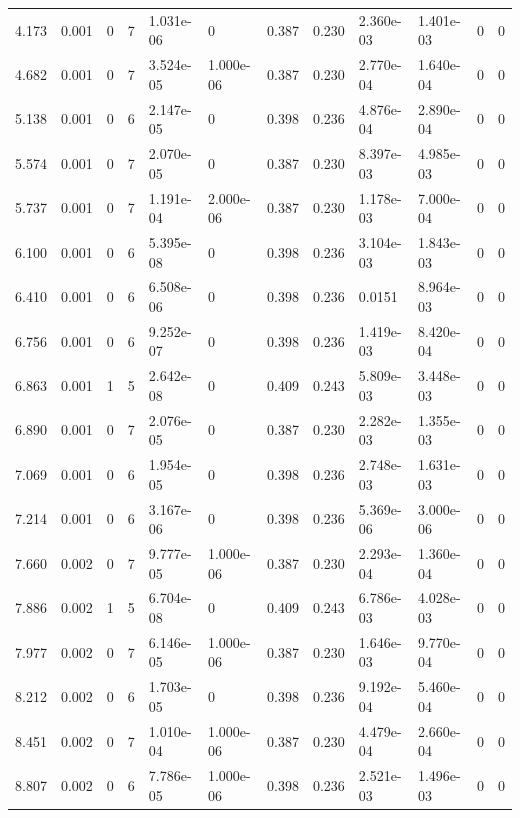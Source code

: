 \documentclass[preview]{standalone}
\begin{document}
{{\begin{tabular}{L{1.2cm}C{1.2cm} C{0.3cm}C{0.5cm} C{1.4cm}C{1.4cm} C{1.4cm}C{1.4cm} C{1.6cm}C{1.6cm} C{1.6cm}C{1.6cm}}
  4.173  &  0.001  & 0     &  7 &  1.031e-06  & 0  &  0.387&   0.230& 2.360e-03 & 1.401e-03   &  0 & 0  \\ 
  4.682  &  0.001  & 0     &  7 &  3.524e-05  & 1.000e-06  &  0.387&   0.230& 2.770e-04 & 1.640e-04   &  0 & 0  \\ 
  5.138  &  0.001  & 0     &  6 &  2.147e-05  & 0  &  0.398&   0.236& 4.876e-04 & 2.890e-04   &  0 & 0  \\ 
  5.574  &  0.001  & 0     &  7 &  2.070e-05  & 0  &  0.387&   0.230& 8.397e-03 & 4.985e-03   &  0 & 0  \\ 
  5.737  &  0.001  & 0     &  7 &  1.191e-04  & 2.000e-06  &  0.387&   0.230& 1.178e-03 & 7.000e-04   &  0 & 0  \\ 
  6.100  &  0.001  & 0     &  6 &  5.395e-08  & 0  &  0.398&   0.236& 3.104e-03 & 1.843e-03   &  0 & 0  \\ 
  6.410  &  0.001  & 0     &  6 &  6.508e-06  & 0  &  0.398&   0.236& 0.0151 & 8.964e-03   &  0 & 0  \\ 
  6.756  &  0.001  & 0     &  6 &  9.252e-07  & 0  &  0.398&   0.236& 1.419e-03 & 8.420e-04   &  0 & 0  \\ 
  6.863  &  0.001  & 1     &  5 &  2.642e-08  & 0  &  0.409&   0.243& 5.809e-03 & 3.448e-03   &  0 & 0  \\ 
  6.890  &  0.001  & 0     &  7 &  2.076e-05  & 0  &  0.387&   0.230& 2.282e-03 & 1.355e-03   &  0 & 0  \\ 
  7.069  &  0.001  & 0     &  6 &  1.954e-05  & 0  &  0.398&   0.236& 2.748e-03 & 1.631e-03   &  0 & 0  \\ 
  7.214  &  0.001  & 0     &  6 &  3.167e-06  & 0  &  0.398&   0.236& 5.369e-06 & 3.000e-06   &  0 & 0  \\ 
  7.660  &  0.002  & 0     &  7 &  9.777e-05  & 1.000e-06  &  0.387&   0.230& 2.293e-04 & 1.360e-04   &  0 & 0  \\ 
  7.886  &  0.002  & 1     &  5 &  6.704e-08  & 0  &  0.409&   0.243& 6.786e-03 & 4.028e-03   &  0 & 0  \\ 
  7.977  &  0.002  & 0     &  7 &  6.146e-05  & 1.000e-06  &  0.387&   0.230& 1.646e-03 & 9.770e-04   &  0 & 0  \\ 
  8.212  &  0.002  & 0     &  6 &  1.703e-05  & 0  &  0.398&   0.236& 9.192e-04 & 5.460e-04   &  0 & 0  \\ 
  8.451  &  0.002  & 0     &  7 &  1.010e-04  & 1.000e-06  &  0.387&   0.230& 4.479e-04 & 2.660e-04   &  0 & 0  \\ 
  8.807  &  0.002  & 0     &  6 &  7.786e-05  & 1.000e-06  &  0.398&   0.236& 2.521e-03 & 1.496e-03   &  0 & 0  \\ 

\end{tabular}}}
\end{document}
